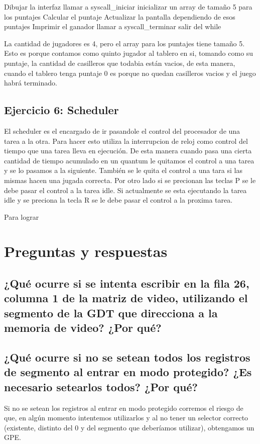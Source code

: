 \documentclass[a4paper,10pt,twoside]{article}
\newenvironment{pseudocodigo}
    {\vspace{0.5em} \begin{algorithmic}}
    {\end{algorithmic} \vspace{0.5em}}
\begin{document}
\begin{pseudocodigo}
  \STATE Dibujar la interfaz
  \STATE llamar a syscall\_iniciar
  \STATE inicializar un array de tamaño 5 para los puntajes
  \STATE
    \STATE
    \STATE Calcular el puntaje
    \STATE Actualizar la pantalla dependiendo de esos puntajes
    \STATE
      \STATE
      \STATE Imprimir el ganador
      \STATE llamar a syscall\_terminar
      \STATE salir del while
    \ENDIF
  \ENDWHILE
  \STATE
\end{pseudocodigo}

La cantidad de jugadores es 4, pero el array para los puntajes tiene tamaño 5. Esto es porque contamos como quinto  jugador al tablero en si, tomando como su puntaje, la cantidad de casilleros que todabia están vacios, de esta manera, cuando el tablero tenga puntaje $0$ es porque no quedan casilleros vacios y el juego habrá terminado.

\subsection{Ejercicio 6: Scheduler}

El scheduler es el encargado de ir pasandole el control del procesador de una tarea a la otra. Para hacer esto utiliza la interrupcion de reloj como control del tiempo que una tarea lleva en ejecución. De esta manera cuando pasa una cierta cantidad de tiempo acumulado en un quantum le quitamos el control a una tarea y se lo pasamos a la siguiente. También se le quita el control a una tara si las mismas hacen una jugada correcta.
Por otro lado si se precionan las teclas P se le debe pasar el control a la tarea idle. Si actualmente se esta ejecutando la tarea idle y se preciona la tecla R se le debe pasar el control a la proxima tarea.

Para lograr 



\section{Preguntas y respuestas}
\subsection{¿Qué ocurre si se intenta escribir en la fila 26, columna 1 de la matriz de video, utilizando el segmento de la GDT que direcciona a la memoria de video? ¿Por qué?}

\subsection{¿Qué ocurre si no se setean todos los registros de segmento al entrar en
modo protegido? ¿Es necesario setearlos todos? ¿Por qué?}
Si no se setean los registros al entrar en modo protegido corremos el riesgo de que, en algún momento intentemos utilizarlos y al no tener un selector correcto (existente, distinto del 0 y del segmento que deberíamos utilizar), obtengamos un GPE.
\end{document}
